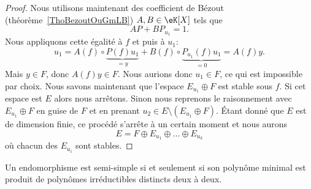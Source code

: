 \begin{proof}
	Nous utilisons maintenant des coefficient de Bézout (théorème~\ref{ThoBezoutOuGmLB}) \( A,B\in \eK[X]\) tels que
	\begin{equation}
		AP+BP_{u_1}=1.
	\end{equation}
	Nous appliquons cette égalité à \( f\) et puis à \( u_1\):
	\begin{equation}
		u_1=A(f)\circ \underbrace{P(f)u_1}_{=y}+B(f)\circ \underbrace{P_{u_1}(f)u_1}_{=0}=A(f)y.
	\end{equation}
	Mais \( y\in F\), donc \( A(f)y\in F\). Nous aurions donc \( u_1\in F\), ce qui est impossible par choix. Nous savons maintenant que l'espace \( E_{u_1}\oplus F\) est stable sous \( f\). Si cet espace est \( E\) alors nous arrêtons. Sinon nous reprenons le raisonnement avec \( E_{u_1}\oplus F\) en guise de \( F\) et en prenant \( u_2\in E\setminus(E_{u_1}\oplus F)\). Étant donné que \( E\) est de dimension finie, ce procédé s'arrête à un certain moment et nous aurons
	\begin{equation}
		E=F\oplus E_{u_1}\oplus\ldots\oplus E_{u_k}
	\end{equation}
	où chacun des \( E_{u_i}\) sont stables.
\end{proof}

\begin{theorem} \label{ThoFgsxCE}
	Un endomorphisme est semi-simple si et seulement si son polynôme minimal est produit de polynômes irréductibles distincts deux à deux.
\end{theorem}

